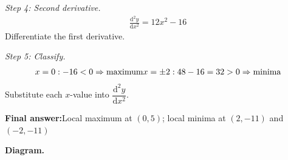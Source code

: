\documentclass[11pt]{article}
\begin{document}
\textit{Step 4: Second derivative.}
\[\begin{gathered}
\frac{\mathrm{d}^2y}{\mathrm{d}x^2} = 12x^2 - 16
\end{gathered}\]
Differentiate the first derivative.

\textit{Step 5: Classify.}
\[\begin{gathered}
x=0: -16 < 0 \Rightarrow \text{maximum} \newline x=\pm2: 48 - 16 = 32 > 0 \Rightarrow \text{minima}
\end{gathered}\]
Substitute each \( x \)-value into \( \dfrac{\mathrm{d}^2y}{\mathrm{d}x^2} \).

\begin{answerbox}
\textbf{Final answer:}\quad Local maximum at \(\displaystyle  (0, 5) \); local minima at \(\displaystyle  (2, -11) \) and \(\displaystyle  (-2, -11) \)
\end{answerbox}
\textbf{Diagram.}
\end{document}
